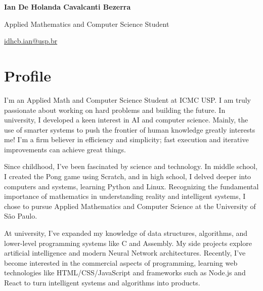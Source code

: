 \documentclass[a4paper,11pt]{article}
\begin{document}
\vspace*{-2cm} %

\begin{center}
\huge\textbf{Ian De Holanda Cavalcanti Bezerra}

\large Applied Mathematics and Computer Science Student

\normalsize\href{mailto:idhcb.ian@usp.br}{idhcb.ian@usp.br}
\end{center}

\section*{Profile}
\vspace{-0.3em}
\begin{multicols}{2}
\setlength{\columnsep}{0.4cm}
\setlength{\parindent}{0pt}
\setlength{\parskip}{0.2em}
\small

I'm an Applied Math and Computer Science Student at ICMC USP. I am truly passionate about working on hard problems and building the future. In university, I developed a keen interest in AI and computer science. Mainly, the use of smarter systems to push the frontier of human knowledge greatly interests me! I'm a firm believer in efficiency and simplicity; fast execution and iterative improvements can achieve great things. 

Since childhood, I've been fascinated by science and technology. In middle school, I created the Pong game using Scratch, and in high school, I delved deeper into computers and systems, learning Python and Linux. Recognizing the fundamental importance of mathematics in understanding reality and intelligent systems, I chose to pursue Applied Mathematics and Computer Science at the University of São Paulo.

At university, I've expanded my knowledge of data structures, algorithms, and lower-level programming systems like C and Assembly. My side projects explore artificial intelligence and modern Neural Network architectures. Recently, I've become interested in the commercial aspects of programming, learning web technologies like HTML/CSS/JavaScript and frameworks such as Node.js and React to turn intelligent systems and algorithms into products.

\end{multicols}
\vspace{-0.3em}
\end{document}
